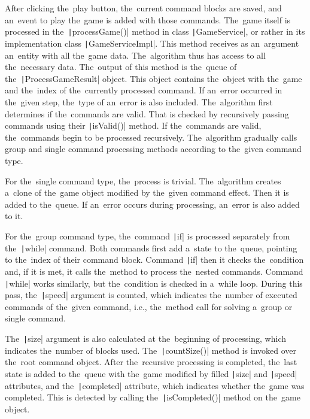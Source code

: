 After clicking the~play button, the~current command blocks are saved, and an~event to play the~game is added with those commands.
The~game itself is processed in the~\texttt|processGame()| method in class \texttt|GameService|, or rather in its implementation class \texttt|GameServiceImpl|.
This method receives as an~argument an~entity with all the~game data.
The~algorithm thus has access to all the~necessary data.
The~output of this method is the~queue of the~\texttt|ProcessGameResult| object.
This object contains the~object with the~game and the~index of the~currently processed command.
If an~error occurred in the~given step, the~type of an~error is also included. 
The~algorithm first determines if the~commands are valid.
That is checked by recursively passing commands using their \texttt|isValid()| method.
If the~commands are valid, the~commands begin to be processed recursively.
The~algorithm gradually calls group and single command processing methods according to the~given command type.

For the~single command type, the~process is trivial.
The~algorithm creates a~clone of the~game object modified by the~given command effect.
Then it is added to the~queue.
If an~error occurs during processing, an~error is also added to it.

For the~group command type, the~command \texttt|if| is processed separately from the~\texttt|while| command.
Both commands first add a~state to the~queue, pointing to the~index of their command block.
Command \texttt|if| then it checks the~condition and, if it is met, it calls the~method to process the~nested commands.
Command \texttt|while| works similarly, but the~condition is checked in a~while loop.
During this pass, the~\texttt|speed| argument is counted, which indicates the~number of executed commands of the~given command, i.e., the~method call for solving a~group or single command.

The~\texttt|size| argument is also calculated at the~beginning of processing, which indicates the~number of blocks used.
The~\texttt|countSize()| method is invoked over the~root command object.
After the~recursive processing is completed, the~last state is added to the~queue with the~game modified by filled \texttt|size| and \texttt|speed| attributes, and the~\texttt|completed| attribute, which indicates whether the~game was completed.
This is detected by calling the~\texttt|isCompleted()| method on the~game object.
